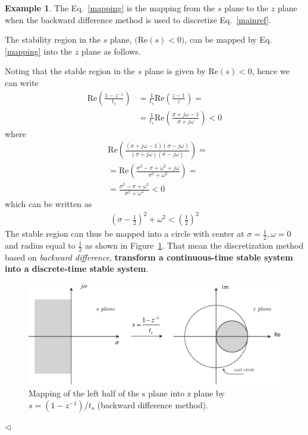 \documentclass[11pt,a4paper,oneside]{book}
\numberwithin{equation}{section}
\theoremstyle{it}
\theoremstyle{definition}
\newtheorem{example}{Example}[chapter]
\begin{document}
\begin{example}
The Eq.~\eqref{mapping} is the mapping from the $s$ plane to the $z$ plane when the backward difference method is used to discretize Eq.~\eqref{mainref}.

The stability region in the $s$ plane, $\Big(\text{Re}(s)<0\Big)$, can be 
mapped by Eq. 
\ref{mapping} into the $z$ plane as follows.

Noting that the stable region in the $s$ plane is given by $\text{Re}(s)<0$, hence we can write
\begin{equation}
	\begin{split}
		\text{Re}\left(\frac{1-z^{-1}}{t_s} \right) &= \frac{1}{t_s}\text{Re}\left(\frac{z-1}{z} \right) = \\[6pt]
		&= \frac{1}{t_s}\text{Re}\left(\frac{\sigma +j\omega -1}{\sigma+j\omega} \right)<0
	\end{split}
\end{equation}
where
\begin{equation}
	\begin{split}
		& \text{Re} \left(\frac{\left( \sigma +j\omega -1 \right) \left(\sigma-j\omega \right) }{\left( \sigma+j\omega \right) \left(\sigma-j\omega \right) } \right) = \\[6pt]
		& = \text{Re} \left( \frac{\sigma^2-\sigma+\omega^2+j\omega}{\sigma^2+\omega^2}\right) = \\[6pt]
		& = \frac{\sigma^2-\sigma+\omega^2}{\sigma^2+\omega^2} <0
	\end{split}
\end{equation}
which can be written as
\begin{equation}
	\begin{split}
		\left( \sigma-\frac{1}{2} \right)^2+\omega^2 < \left( \frac{1}{2}\right)^2
	\end{split}
\end{equation}
The stable region can thus be mapped into a circle with center at $\sigma = 
\frac{1}{2}, \omega=0$ and radius equal to $\frac{1}{2}$ as shown in 
Figure~\ref{figure_discretization_3}. That mean the discretization method based 
on \textit{backward difference}, \textbf{transform a continuous-time stable 
system into a discrete-time stable system}.

\begin{figure}[H]
	\centering
	\includegraphics[width = 380pt, 
	keepaspectratio]{figures/discretization/backward.eps}
		\captionsetup{width=0.5\textwidth, font=small}		
		\caption{Mapping of the left half of the s plane into z plane by $s = (1-z^{-1})/t_s$ (backward difference method).}
	\label{figure_discretization_3}
\end{figure}
$\triangleleft$ 
\end{example}
\end{document}
